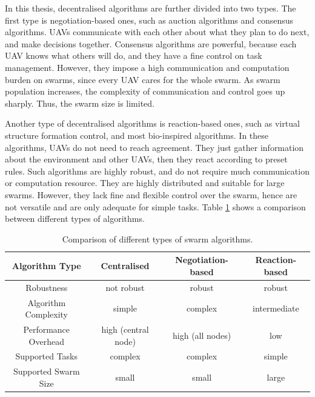 In this thesis, decentralised algorithms are further divided into two types.
The first type is negotiation-based ones,
such as auction algorithms and consensus algorithms.
UAVs communicate with each other about what they plan to do next,
and make decisions together.
Consensus algorithms are powerful,
because each UAV knows what others will do,
and they have a fine control on task management.
However, they impose a high communication and computation burden on swarms,
since every UAV cares for the whole swarm.
As swarm population increases,
the complexity of communication and control goes up sharply.
Thus, the swarm size is limited.

Another type of decentralised algorithms is reaction-based ones,
such as virtual structure formation control, and most bio-inspired algorithms.
In these algorithms, UAVs do not need to reach agreement.
They just gather information about the environment and other UAVs,
then they react according to preset rules.
Such algorithms are highly robust,
and do not require much communication or computation resource.
They are highly distributed and suitable for large swarms.
However, they lack fine and flexible control over the swarm,
hence are not versatile and are only adequate for simple tasks.
Table \ref{tbl:algorithms_cmp} shows a comparison between different types of algorithms.

\begin{table}[htbp]
\centering
\caption[Comparison of swarm algorithms.]
{Comparison of different types of swarm algorithms.}
\label{tbl:algorithms_cmp}
\begin{tabular}{|c||c|c|c|}
  \hline
  Algorithm Type       & Centralised         & Negotiation-based & Reaction-based \\
  \hline\hline
  Robustness           & not robust          & robust            & robust         \\
  \hline
  Algorithm Complexity & simple              & complex           & intermediate   \\
  \hline
  Performance Overhead & high (central node) & high (all nodes)  & low            \\
  \hline
  Supported Tasks      & complex             & complex           & simple         \\
  \hline
  Supported Swarm Size & small               & small             & large          \\
  \hline
\end{tabular}
\end{table}


